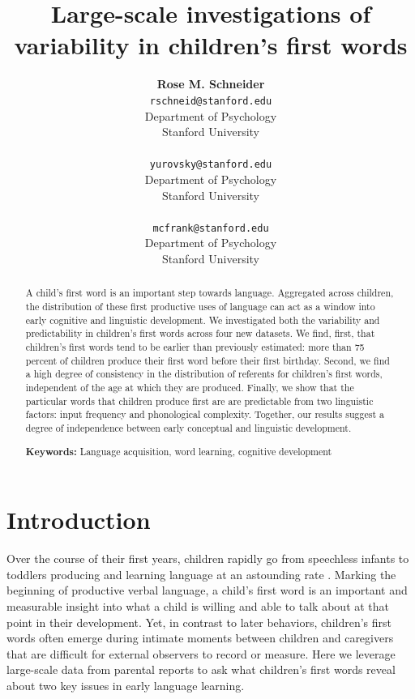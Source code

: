 \documentclass[10pt,letterpaper]{article}
\title{Large-scale investigations of variability in children's first words}
\author{{\large \bf Rose M. Schneider} \\ \texttt{rschneid@stanford.edu}\\ Department of Psychology \\ Stanford University \\ 
\And {\large \bf Daniel Yurovsky} \\ \texttt{yurovsky@stanford.edu} \\ Department of Psychology \\ Stanford University \\ 
\And {\large \bf Michael C. Frank} \\ \texttt{mcfrank@stanford.edu} \\ Department of Psychology \\ Stanford University \\ }
\begin{document}
\maketitle


\begin{abstract}
A child's first word is an important step towards language. Aggregated across children, the distribution of these first productive uses of language can act as a window into early cognitive and linguistic development. We investigated both the variability and predictability in children's first words across four new datasets. We find, first, that children's first words tend to be earlier than previously estimated: more than 75 percent of children produce their first word before their first birthday. Second, we find a high degree of consistency in the distribution of referents for children's first words, independent of the age at which they are produced. Finally, we show that the particular words that children produce first are are predictable from two linguistic factors: input frequency and phonological complexity. Together, our results suggest a degree of independence between early conceptual and linguistic development.

\textbf{Keywords:}
Language acquisition, word learning, cognitive development
\end{abstract}

\section{Introduction}

Over the course of their first years, children rapidly go from speechless infants to toddlers producing and learning language at an astounding rate \cite{fenson1994}. Marking the beginning of productive verbal language, a child's first word is an important and measurable insight into what a child is willing and able to talk about at that point in their development. Yet, in contrast to later behaviors, children's first words often emerge during intimate moments between children and caregivers that are difficult for external observers to record or measure. Here we leverage large-scale data from parental reports to ask what children's first words reveal about two key issues in early language learning. 
\end{document}
